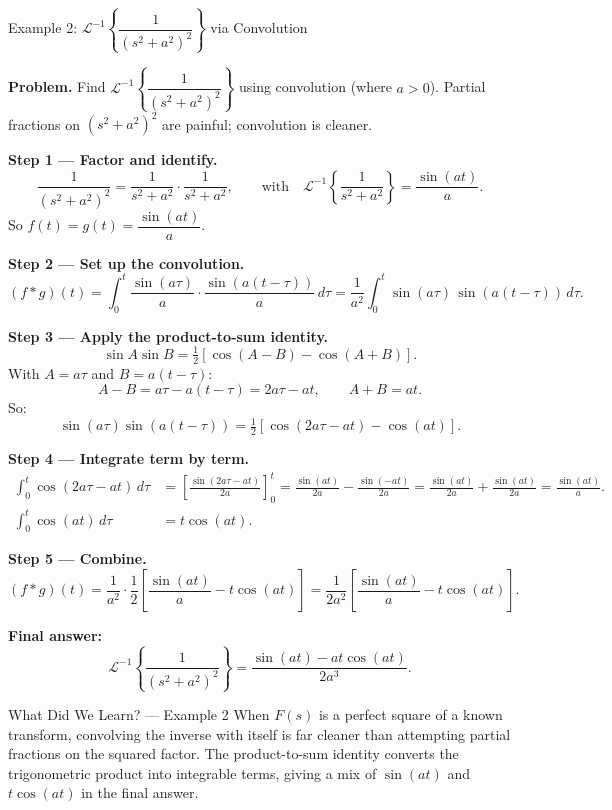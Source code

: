 \documentclass[12pt,a4paper]{article}
\begin{document}
\begin{infobox}{Example 2: $\mathcal{L}^{-1}\!\left\{\dfrac{1}{(s^2+a^2)^2}\right\}$ via Convolution}

\textbf{Problem.} Find $\mathcal{L}^{-1}\!\left\{\dfrac{1}{(s^2+a^2)^2}\right\}$ using convolution
(where $a>0$). Partial fractions on $(s^2+a^2)^2$ are painful; convolution is cleaner.

\medskip
\textbf{Step 1 --- Factor and identify.}
\[
  \frac{1}{(s^2+a^2)^2} = \frac{1}{s^2+a^2}\cdot\frac{1}{s^2+a^2},\qquad
  \text{with}\quad \mathcal{L}^{-1}\!\left\{\frac{1}{s^2+a^2}\right\} = \frac{\sin(at)}{a}.
\]
So $f(t)=g(t)=\dfrac{\sin(at)}{a}$.

\medskip
\textbf{Step 2 --- Set up the convolution.}
\[
  (f*g)(t) = \int_0^t \frac{\sin(a\tau)}{a}\cdot\frac{\sin\!\left(a(t-\tau)\right)}{a}\,d\tau
  = \frac{1}{a^2}\int_0^t \sin(a\tau)\,\sin\!\left(a(t-\tau)\right)\,d\tau.
\]

\textbf{Step 3 --- Apply the product-to-sum identity.}
\[
  \sin A\sin B = \tfrac{1}{2}\!\left[\cos(A-B)-\cos(A+B)\right].
\]
With $A=a\tau$ and $B=a(t-\tau)$:
\[
  A-B = a\tau - a(t-\tau) = 2a\tau - at, \qquad A+B = at.
\]
So:
\[
  \sin(a\tau)\sin(a(t-\tau)) = \tfrac{1}{2}\!\left[\cos(2a\tau-at)-\cos(at)\right].
\]

\textbf{Step 4 --- Integrate term by term.}
\begin{align*}
  \int_0^t \cos(2a\tau-at)\,d\tau
  &= \left[\frac{\sin(2a\tau-at)}{2a}\right]_0^t
   = \frac{\sin(at)}{2a} - \frac{\sin(-at)}{2a}
   = \frac{\sin(at)}{2a} + \frac{\sin(at)}{2a}
   = \frac{\sin(at)}{a}.\\[6pt]
  \int_0^t \cos(at)\,d\tau &= t\cos(at).
\end{align*}

\textbf{Step 5 --- Combine.}
\[
  (f*g)(t) = \frac{1}{a^2}\cdot\frac{1}{2}\left[\frac{\sin(at)}{a} - t\cos(at)\right]
  = \frac{1}{2a^2}\left[\frac{\sin(at)}{a} - t\cos(at)\right].
\]

\textbf{Final answer:}
\[
  \mathcal{L}^{-1}\!\left\{\frac{1}{(s^2+a^2)^2}\right\}
  = \frac{\sin(at) - at\cos(at)}{2a^3}.
\]
\end{infobox}

\begin{learnbox}{What Did We Learn? --- Example 2}
When $F(s)$ is a perfect square of a known transform, convolving the inverse with itself is
far cleaner than attempting partial fractions on the squared factor. The product-to-sum
identity converts the trigonometric product into integrable terms, giving a mix of $\sin(at)$
and $t\cos(at)$ in the final answer.
\end{learnbox}
\end{document}
